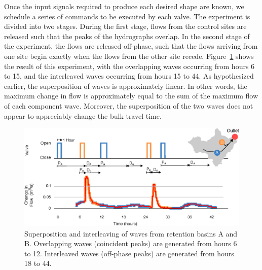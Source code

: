 Once the input signals required to produce each desired shape are known, we schedule a series of commands to be executed by each valve. The experiment is divided into two stages.
During the first stage, flows from the control sites are released such that the peaks of the hydrographs overlap.
In the second stage of the experiment, the flows are released off-phase, such that the flows arriving from one site begin exactly when the flows from the other site recede.
Figure~\ref{fig-ch2:fig6} shows the result of this experiment, with the overlapping waves occurring from hours 6 to 15, and the interleaved waves occurring from hours 15 to 44. As hypothesized earlier, the superposition of waves is approximately linear. In other words, the maximum change in flow is approximately equal to the sum of the maximum flow of each component wave. Moreover, the superposition of the two waves does not appear to appreciably change the bulk travel time.


\begin{figure}
    \centering
    \includegraphics[width=\textwidth]{gfx/Chapter-2/Figure6.eps}
    \caption{Superposition and interleaving of waves from retention basins A and B.
    Overlapping waves (coincident peaks) are generated from hours 6 to 12. Interleaved waves (off-phase peaks) are generated from hours 18 to 44.
    }\label{fig-ch2:fig6}
\end{figure}

